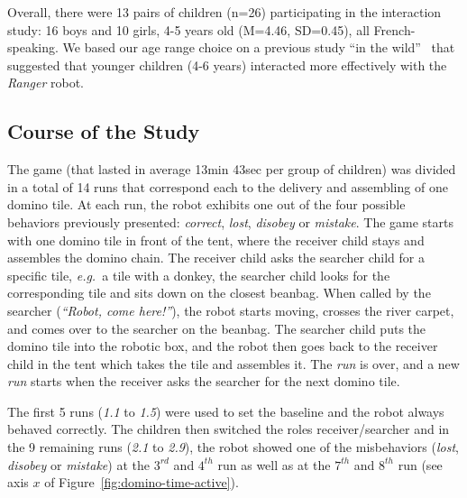 \documentclass[letterpaper, 10pt, conference]{ieeeconf}
\newcommand{\eg}{{\textit{e.g.~}}}
\begin{document}
Overall, there were 13 pairs of children (n=26) participating in the interaction
study: 16 boys and 10 girls, 4-5 years old (M=4.46, SD=0.45), all
French-speaking. We based our age range choice on a previous study ``in the
wild''~\cite{fink2014which} that suggested that younger children (4-6 years)
interacted more effectively with the \emph{Ranger} robot.



\subsection{Course of the Study}

The game (that lasted in average 13min 43sec per group of children) was divided
in a total of 14 runs that correspond each to the delivery and assembling of one
domino tile. At each run, the robot exhibits one out of the four possible
behaviors previously presented: \emph{correct}, \emph{lost}, \emph{disobey} or
\emph{mistake}.  The game starts with one domino tile in front of the tent,
where the receiver child stays and assembles the domino chain. The receiver
child asks the searcher child for a specific tile, \eg a tile with a donkey, the
searcher child looks for the corresponding tile and sits down on the closest
beanbag. When called by the searcher (\textit{``Robot, come here!''}), the robot
starts moving, crosses the river carpet, and comes over to the searcher on the
beanbag. The searcher child puts the domino tile into the robotic box, and the
robot then goes back to the receiver child in the tent which takes the tile and
assembles it. The \emph{run} is over, and a new \emph{run} starts when the
receiver asks the searcher for the next domino tile.

The first 5 runs (\emph{1.1} to \emph{1.5}) were used to set
the baseline and the robot always behaved correctly. The children then switched
the roles receiver/searcher and in the 9 remaining runs (\emph{2.1} to
\emph{2.9}), the robot showed one of the misbehaviors (\emph{lost},
\emph{disobey} or \emph{mistake}) at the $3^{rd}$ and $4^{th}$ run as well as at
the $7^{th}$ and $8^{th}$ run (see axis $x$ of Figure~\ref{fig:domino-time-active}).
\end{document}
